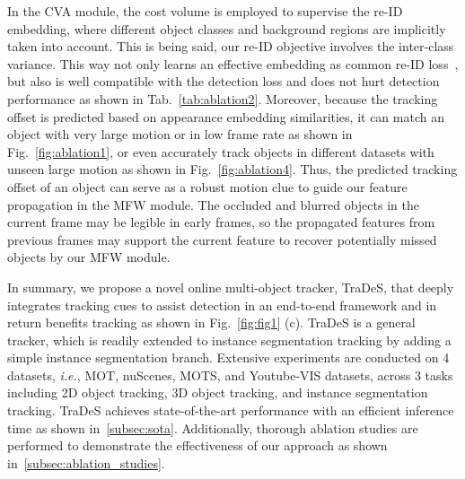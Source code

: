 \documentclass[final]{cvpr}
\begin{document}
In the CVA module, the cost volume is employed to supervise the re-ID embedding, where different object classes and background regions are implicitly taken into account. This is being said, our re-ID objective involves the inter-class variance. This way not only learns an effective embedding as common re-ID loss~\cite{wang2019towards, lu2020retinatrack, schroff2015facenet, xiao2017joint}, but also is well compatible with the detection loss and does not hurt detection performance as shown in Tab.~\ref{tab:ablation2}. Moreover, because the tracking offset is predicted based on appearance embedding similarities, it can match an object with very large motion or in low frame rate as shown in Fig.~\ref{fig:ablation1}, or even accurately track objects in different datasets with unseen large motion as shown in Fig.~\ref{fig:ablation4}. Thus, the predicted tracking offset of an object can serve as a robust motion clue to guide our feature propagation in the MFW module. The occluded and blurred objects in the current frame may be legible in early frames, so the propagated features from previous frames may support the current feature to recover potentially missed objects by our MFW module.

In summary, we propose a novel online multi-object tracker, TraDeS, that deeply integrates tracking cues to assist detection in an end-to-end framework and in return benefits tracking as shown in Fig.~\ref{fig:fig1} (c). TraDeS is a general tracker, which is readily extended to instance segmentation tracking by adding a simple instance segmentation branch. Extensive experiments are conducted on 4 datasets, \emph{i.e.}, MOT, nuScenes, MOTS, and Youtube-VIS datasets, across 3 tasks including 2D object tracking, 3D object tracking, and instance segmentation tracking. TraDeS achieves state-of-the-art performance with an efficient inference time as shown in~\cref{subsec:sota}. Additionally, thorough ablation studies are performed to demonstrate the effectiveness of our approach as shown in~\cref{subsec:ablation_studies}.
\end{document}
